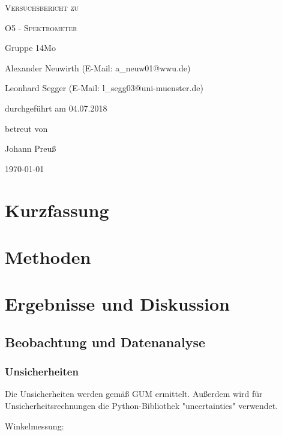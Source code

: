 \documentclass[
	a4paper,
	12pt,
	pagesize,
	ngerman
]{scrartcl}
\begin{document}
	
	\begin{titlepage}
		\centering
		{\scshape\LARGE Versuchsbericht zu \par}
		\vspace{1cm}
		{\scshape\huge O5 - Spektrometer \par}
		\vspace{2.5cm}
		{\LARGE Gruppe 14Mo \par}
		\vspace{0.5cm}
		
		{\large Alexander Neuwirth (E-Mail: a\_neuw01@wwu.de) \par}
		{\large Leonhard Segger (E-Mail: l\_segg03@uni-muenster.de) \par}
		\vfill
		
		durchgeführt am 04.07.2018\par
		betreut von\par
		{\large Johann Preuß} 
		
		\vfill
		
		{\large \today\par}
	\end{titlepage}
	\tableofcontents
	\newpage

	\section{Kurzfassung}
	
	\section{Methoden}
	
	\section{Ergebnisse und Diskussion}
	

	\subsection{Beobachtung und Datenanalyse}
	\subsubsection{Unsicherheiten} %
	Die Unsicherheiten werden gemäß GUM ermittelt. 
	Außerdem wird für Unsicherheitsrechnungen die Python-Bibliothek "uncertainties" verwendet.
	\begin{description}
		\item[Winkelmessung:] 
	\end{description}
\end{document}

